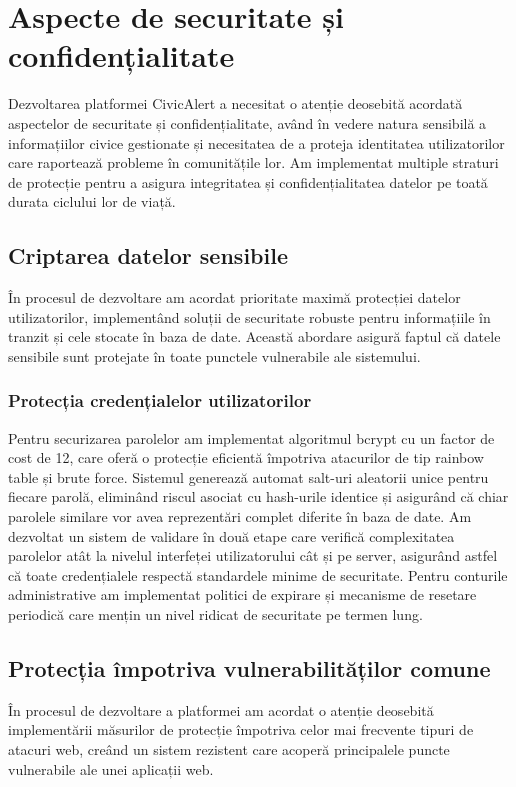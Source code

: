 \documentclass[12pt,a4paper]{report}
\begin{document}
\section{Aspecte de securitate și confidențialitate}
Dezvoltarea platformei CivicAlert a necesitat o atenție deosebită acordată aspectelor de securitate și confidențialitate, având în vedere natura sensibilă a informațiilor civice gestionate și necesitatea de a proteja identitatea utilizatorilor care raportează probleme în comunitățile lor. Am implementat multiple straturi de protecție pentru a asigura integritatea și confidențialitatea datelor pe toată durata ciclului lor de viață.
\subsection{Criptarea datelor sensibile}
În procesul de dezvoltare am acordat prioritate maximă protecției datelor utilizatorilor, implementând soluții de securitate robuste pentru informațiile în tranzit și cele stocate în baza de date. Această abordare  asigură faptul că datele sensibile sunt protejate în toate punctele vulnerabile ale sistemului.
\subsubsection{Protecția credențialelor utilizatorilor}
Pentru securizarea parolelor am implementat algoritmul bcrypt cu un factor de cost de 12, care oferă o protecție eficientă împotriva atacurilor de tip rainbow table și brute force. Sistemul generează automat salt-uri aleatorii unice pentru fiecare parolă, eliminând riscul asociat cu hash-urile identice și asigurând că chiar parolele similare vor avea reprezentări complet diferite în baza de date.
Am dezvoltat un sistem de validare în două etape care verifică complexitatea parolelor atât la nivelul interfeței utilizatorului cât și pe server, asigurând astfel că toate credențialele respectă standardele minime de securitate. Pentru conturile administrative am implementat politici de expirare și mecanisme de resetare periodică care mențin un nivel ridicat de securitate pe termen lung.



\subsection{Protecția împotriva vulnerabilităților comune}
În procesul de dezvoltare a platformei am acordat o atenție deosebită implementării măsurilor de protecție împotriva celor mai frecvente tipuri de atacuri web, creând un sistem rezistent care acoperă principalele puncte vulnerabile ale unei aplicații web.
\end{document}
